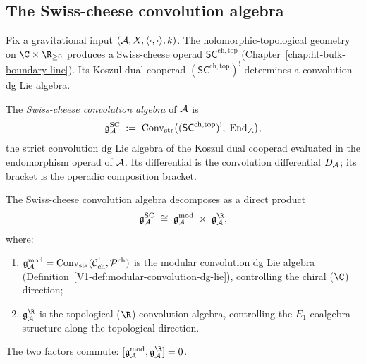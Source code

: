 \subsection{The Swiss-cheese convolution algebra}

Fix a gravitational input $(\mathcal{A}, X, \langle\cdot,\cdot\rangle, k)$.
The holomorphic-topological geometry on $\C \times \R_{\ge 0}$ produces
a Swiss-cheese operad $\mathsf{SC}^{\mathrm{ch,top}}$
(Chapter~\ref{chap:ht-bulk-boundary-line}).
Its Koszul dual cooperad $(\mathsf{SC}^{\mathrm{ch,top}})^{!}$
determines a convolution dg Lie algebra.

\begin{definition}
The \emph{Swiss-cheese convolution algebra} of $\mathcal{A}$ is
\begin{equation}%
\mathfrak{g}^{\mathrm{SC}}_\cA
\;:=\;
\Convstr\bigl(
(\mathsf{SC}^{\mathrm{ch,top}})^{!},\;
\End_\cA
\bigr),
\end{equation}
the strict convolution dg Lie algebra of the Koszul dual cooperad
evaluated in the endomorphism operad of $\mathcal{A}$. Its differential is
the convolution differential $D_{\mathcal{A}}$; its bracket is the
operadic composition bracket.
\end{definition}

\begin{proposition}
The Swiss-cheese convolution algebra decomposes as a direct product
\begin{equation}%
\mathfrak{g}^{\mathrm{SC}}_\cA
\;\cong\;
\gAmod \;\times\; \mathfrak{g}^{\R}_\cA,
\end{equation}
where:
\begin{enumerate}[label=\textup{(\alph*)}]
\item $\mathfrak{g}_{\mathcal{A}}^{\mathrm{mod}} = \operatorname{Conv}_{\mathrm{str}}(\mathcal{C}^!_{\mathrm{ch}},
 \mathcal{P}^{\mathrm{ch}})$ is the modular convolution dg Lie
 algebra (Definition~\ref*{V1-def:modular-convolution-dg-lie}),
 controlling the chiral ($\C$) direction;
\item $\mathfrak{g}^{\R}_\cA$ is the topological ($\R$) convolution
 algebra, controlling the $E_1$-coalgebra structure along the
 topological direction.
\end{enumerate}
The two factors commute: $[\gAmod, \mathfrak{g}^{\R}_\cA] = 0$.
\end{proposition}

